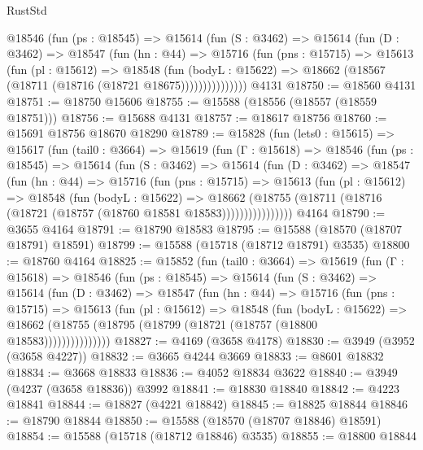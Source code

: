 \begin{lexlean}{RustStd}
\begin{coremodule}
          @18546
            (fun (ps : @18545) =>
            @15614
              (fun (S : @3462) =>
              @15614
                (fun (D : @3462) =>
                @18547
                  (fun (hn : @44) =>
                  @15716
                    (fun (pns : @15715) =>
                    @15613
                      (fun (pl : @15612) =>
                      @18548
                        (fun (bodyL : @15622) =>
                        @18662 (@18567 (@18711 (@18716 (@18721 @18675)))))))))))))))
    @4131
@18750 := @18560 @4131
@18751 := @18750 @15606
@18755 := @15588 (@18556 (@18557 (@18559 @18751)))
@18756 := @15688 @4131
@18757 := @18617 @18756
@18760 := @15691 @18756 @18670 @18290
@18789 := @15828
    (fun (lets0 : @15615) =>
    @15617
      (fun (tail0 : @3664) =>
      @15619
        (fun (Γ : @15618) =>
        @18546
          (fun (ps : @18545) =>
          @15614
            (fun (S : @3462) =>
            @15614
              (fun (D : @3462) =>
              @18547
                (fun (hn : @44) =>
                @15716
                  (fun (pns : @15715) =>
                  @15613
                    (fun (pl : @15612) =>
                    @18548
                      (fun (bodyL : @15622) =>
                      @18662
                        (@18755
                          (@18711 (@18716 (@18721 (@18757 (@18760 @18581 @18583))))))))))))))))
    @4164
@18790 := @3655 @4164
@18791 := @18790 @18583
@18795 := @15588 (@18570 (@18707 @18791) @18591)
@18799 := @15588 (@15718 (@18712 @18791) @3535)
@18800 := @18760 @4164
@18825 := @15852
    (fun (tail0 : @3664) =>
    @15619
      (fun (Γ : @15618) =>
      @18546
        (fun (ps : @18545) =>
        @15614
          (fun (S : @3462) =>
          @15614
            (fun (D : @3462) =>
            @18547
              (fun (hn : @44) =>
              @15716
                (fun (pns : @15715) =>
                @15613
                  (fun (pl : @15612) =>
                  @18548
                    (fun (bodyL : @15622) =>
                    @18662 (@18755 (@18795 (@18799 (@18721 (@18757 (@18800 @18583)))))))))))))))
@18827 := @4169 (@3658 @4178)
@18830 := @3949 (@3952 (@3658 @4227))
@18832 := @3665 @4244 @3669
@18833 := @8601 @18832
@18834 := @3668 @18833
@18836 := @4052 @18834 @3622
@18840 := @3949 (@4237 (@3658 @18836)) @3992
@18841 := @18830 @18840
@18842 := @4223 @18841
@18844 := @18827 (@4221 @18842)
@18845 := @18825 @18844
@18846 := @18790 @18844
@18850 := @15588 (@18570 (@18707 @18846) @18591)
@18854 := @15588 (@15718 (@18712 @18846) @3535)
@18855 := @18800 @18844

\end{coremodule}
\end{lexlean}
